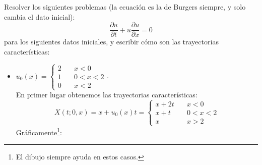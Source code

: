 \begin{ejercicio}
    Resolver los siguientes problemas (la ecuación es la de Burgers siempre, y solo cambia el dato inicial):
    $$\dfrac{\partial u}{\partial t} + u \dfrac{\partial u}{\partial x} = 0$$
    para los siguientes datos iniciales, y escribir cómo son las trayectorias características:
    \begin{itemize}
        \item $u_0(x) = \begin{cases}
            2 \quad& x < 0 \\
            1 \quad& 0 < x < 2 \\
            0 \quad& x < 2
        \end{cases}$. \\

        En primer lugar obtenemos las trayectorias características:
        $$X(t; 0, x) = x + u_0(x) t = \begin{cases}
            x + 2t \quad& x < 0 \\
            x + t \quad& 0 < x < 2 \\
            x \quad& x > 2
        \end{cases}$$
        Gráficamente\footnote{El dibujo siempre ayuda en estos casos.}:
        \begin{figure}[H]
            \begin{center}
                \begin{tikzpicture}[x=0.75pt,y=0.75pt,yscale=-1,xscale=1]


\end{tikzpicture}
\end{center}
\end{figure}
\end{itemize}
\end{ejercicio}
